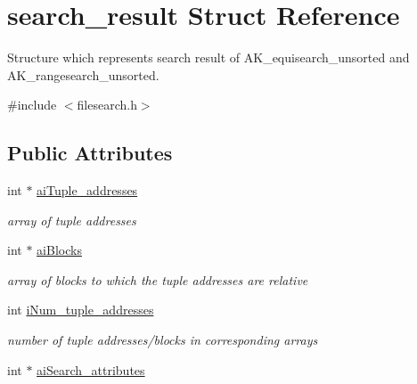 \hypertarget{structsearch__result}{}\section{search\+\_\+result Struct Reference}
\label{structsearch__result}


Structure which represents search result of A\+K\+\_\+equisearch\+\_\+unsorted and A\+K\+\_\+rangesearch\+\_\+unsorted.  




{\ttfamily \#include $<$filesearch.\+h$>$}

\subsection*{Public Attributes}
\begin{DoxyCompactItemize}
\item 
int $\ast$ \hyperlink{structsearch__result_af2cb5dfee775be70399ba31416737727}{ai\+Tuple\+\_\+addresses}\hypertarget{structsearch__result_af2cb5dfee775be70399ba31416737727}{}\label{structsearch__result_af2cb5dfee775be70399ba31416737727}

\begin{DoxyCompactList}\small\item\em array of tuple addresses \end{DoxyCompactList}\item 
int $\ast$ \hyperlink{structsearch__result_a4ba8a4ba679981a3e3273e3089a01a8f}{ai\+Blocks}\hypertarget{structsearch__result_a4ba8a4ba679981a3e3273e3089a01a8f}{}\label{structsearch__result_a4ba8a4ba679981a3e3273e3089a01a8f}

\begin{DoxyCompactList}\small\item\em array of blocks to which the tuple addresses are relative \end{DoxyCompactList}\item 
int \hyperlink{structsearch__result_a983f29e754aa7f890ee2b688b1d7a9b9}{i\+Num\+\_\+tuple\+\_\+addresses}\hypertarget{structsearch__result_a983f29e754aa7f890ee2b688b1d7a9b9}{}\label{structsearch__result_a983f29e754aa7f890ee2b688b1d7a9b9}

\begin{DoxyCompactList}\small\item\em number of tuple addresses/blocks in corresponding arrays \end{DoxyCompactList}\item 
int $\ast$ \hyperlink{structsearch__result_a7017e2fb19d50df97aad9224f8cba682}{ai\+Search\+\_\+attributes}\hypertarget{structsearch__result_a7017e2fb19d50df97aad9224f8cba682}{}\label{structsearch__result_a7017e2fb19d50df97aad9224f8cba682}


\end{DoxyCompactItemize}
